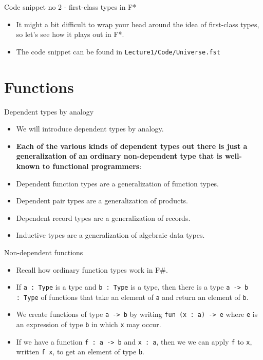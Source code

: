 \documentclass{beamer}
\newcommand{\m}[1]{\texttt{#1}}
\begin{document}
\begin{frame}{Code snippet no 2 - first-class types in F*}
\begin{itemize}
	\item It might a bit difficult to wrap your head around the idea of first-class types, so let's see how it plays out in F*.
	\item The code snippet can be found in \m{Lecture1/Code/Universe.fst}
\end{itemize}
\end{frame}

\section{Functions}

\begin{frame}{Dependent types by analogy}
\begin{itemize}
	\item We will introduce dependent types by analogy.
	\item \textbf{Each of the various kinds of dependent types out there is just a generalization of an ordinary non-dependent type that is well-known to functional programmers}:
	\item Dependent function types are a generalization of function types.
	\item Dependent pair types are a generalization of products.
	\item Dependent record types are a generalization of records.
	\item Inductive types are a generalization of algebraic data types.
\end{itemize}
\end{frame}

\begin{frame}{Non-dependent functions}
\begin{itemize}
	\item Recall how ordinary function types work in F\#.
	\item If \m{a :\ Type} is a type and \m{b :\ Type} is a type, then there is a type \m{a -> b :\ Type} of functions that take an element of \m{a} and return an element of \m{b}.
	\item We create functions of type \m{a -> b} by writing \m{fun (x :\ a) -> e} where \m{e} is an expression of type \m{b} in which \m{x} may occur.
	\item If we have a function \m{f :\ a -> b} and \m{x :\ a}, then we we can apply \m{f} to \m{x}, written \m{f x}, to get an element of type \m{b}.
\end{itemize}
\end{frame}
\end{document}

